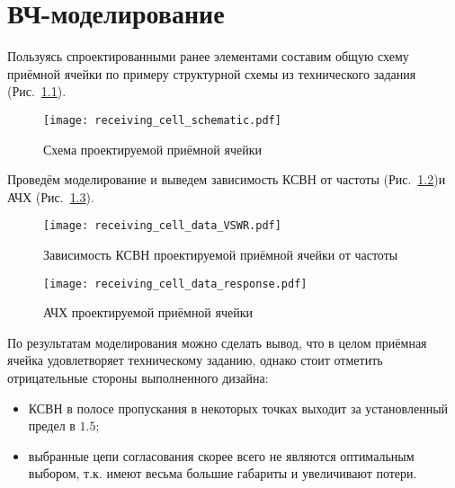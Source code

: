 \chapter{ВЧ-моделирование}

Пользуясь спроектированными ранее элементами составим общую схему приёмной ячейки по примеру структурной схемы из технического задания (Рис.~\ref{fig:receiving_cell_schematic}).

\begin{figure}[!ht]
    \centering
    \texttt{[image: receiving\_cell\_schematic.pdf]}
    \caption{Схема проектируемой приёмной ячейки}%
    \label{fig:receiving_cell_schematic}
\end{figure}

Проведём моделирование и выведем зависимость КСВН от частоты (Рис.~\ref{fig:receiving_cell_data_VSWR})и АЧХ (Рис.~\ref{fig:receiving_cell_data_response}).

\begin{figure}[!ht]
    \centering
    \texttt{[image: receiving\_cell\_data\_VSWR.pdf]}
    \caption{Зависимость КСВН проектируемой приёмной ячейки от частоты}%
    \label{fig:receiving_cell_data_VSWR}
\end{figure}

\begin{figure}[!ht]
    \centering
    \texttt{[image: receiving\_cell\_data\_response.pdf]}
    \caption{АЧХ проектируемой приёмной ячейки}%
    \label{fig:receiving_cell_data_response}
\end{figure}

По результатам моделирования можно сделать вывод, что в целом приёмная ячейка удовлетворяет техническому заданию, однако стоит отметить отрицательные стороны выполненного дизайна:
\begin{itemize}
    \item
        КСВН в полосе пропускания в некоторых точках выходит за установленный предел в $1.5$;
    \item
        выбранные цепи согласования скорее всего не являются оптимальным выбором, т.к. имеют весьма большие габариты и увеличивают потери.
\end{itemize}

